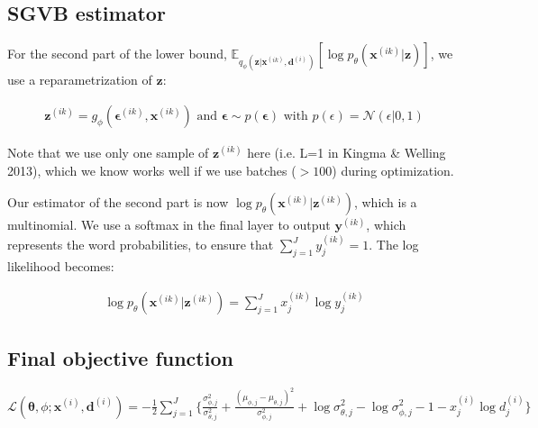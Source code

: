 \documentclass{article}
\begin{document}
\subsection{SGVB estimator}

For the second part of the lower bound, $\mathds{E}_{q_\phi(\mathbf{z}|\mathbf{x}^{(ik)},\mathbf{d}^{(i)})}[\log p_\theta (\mathbf{x}^{(ik)}|\mathbf{z})]$, we use a reparametrization of $\mathbf{z}$:

\begin{align} \mathbf{z}^{(ik)} = g_\phi(\mathbf{\epsilon}^{(ik)}, \mathbf{x}^{(ik)}) \text{    and    } \mathbf{\epsilon} 
 \sim p(\mathbf{\epsilon}) \text{   with  } p(\epsilon) = \mathcal{N}(\epsilon|0,1)
\end{align}

Note that we use only one sample of $\mathbf{z}^{(ik)}$ here (i.e. L=1 in Kingma \& Welling 2013), which we know works well if we use batches ($>100$) during optimization.

Our estimator of the second part is now $\log p_\theta (\mathbf{x}^{(ik)}|\mathbf{z}^{(ik)})$, which is a multinomial. We use a softmax in the final layer to output $\mathbf{y}^{(ik)}$, which represents the word probabilities, to ensure that $\sum\limits_{j=1}^J y_j^{(ik)} = 1$. The log likelihood becomes: 

\begin{align}
\log p_\theta (\mathbf{x}^{(ik)}|\mathbf{z}^(ik)) = \sum\limits_{j=1}^{J}x_j^{(ik)}\log y_j^{(ik)}
\end{align}

\subsection{Final objective function}

$\mathcal{L}(\mathbf{\theta}, \phi; \mathbf{x}^{(i)}, \mathbf{d}^{(i)}) = - \frac{1}{2}\sum\limits_{j=1}^{J}\{\frac{\sigma_{\phi,j}^2}{\sigma_{\theta,j}^2} + \frac{(\mu_{\phi,j} - \mu_{\theta,j})^2}{\sigma_{\phi,j}^2} + \log \sigma_{\theta,j}^2 - \log \sigma_{\phi,j}^2 - 1 - x_j^{(i)}\log d_j^{(i)} \}$
\end{document}
